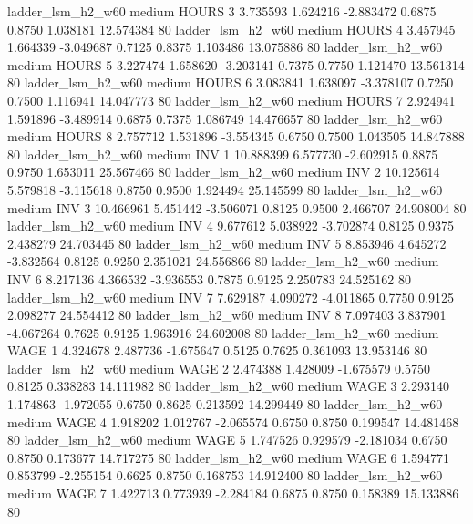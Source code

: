      ladder_lsm_h2_w60     medium    HOURS                 3  3.735593 1.624216 -2.883472 0.6875 0.8750  1.038181   12.574384 80
     ladder_lsm_h2_w60     medium    HOURS                 4  3.457945 1.664339 -3.049687 0.7125 0.8375  1.103486   13.075886 80
     ladder_lsm_h2_w60     medium    HOURS                 5  3.227474 1.658620 -3.203141 0.7375 0.7750  1.121470   13.561314 80
     ladder_lsm_h2_w60     medium    HOURS                 6  3.083841 1.638097 -3.378107 0.7250 0.7500  1.116941   14.047773 80
     ladder_lsm_h2_w60     medium    HOURS                 7  2.924941 1.591896 -3.489914 0.6875 0.7375  1.086749   14.476657 80
     ladder_lsm_h2_w60     medium    HOURS                 8  2.757712 1.531896 -3.554345 0.6750 0.7500  1.043505   14.847888 80
     ladder_lsm_h2_w60     medium      INV                 1 10.888399 6.577730 -2.602915 0.8875 0.9750  1.653011   25.567466 80
     ladder_lsm_h2_w60     medium      INV                 2 10.125614 5.579818 -3.115618 0.8750 0.9500  1.924494   25.145599 80
     ladder_lsm_h2_w60     medium      INV                 3 10.466961 5.451442 -3.506071 0.8125 0.9500  2.466707   24.908004 80
     ladder_lsm_h2_w60     medium      INV                 4  9.677612 5.038922 -3.702874 0.8125 0.9375  2.438279   24.703445 80
     ladder_lsm_h2_w60     medium      INV                 5  8.853946 4.645272 -3.832564 0.8125 0.9250  2.351021   24.556866 80
     ladder_lsm_h2_w60     medium      INV                 6  8.217136 4.366532 -3.936553 0.7875 0.9125  2.250783   24.525162 80
     ladder_lsm_h2_w60     medium      INV                 7  7.629187 4.090272 -4.011865 0.7750 0.9125  2.098277   24.554412 80
     ladder_lsm_h2_w60     medium      INV                 8  7.097403 3.837901 -4.067264 0.7625 0.9125  1.963916   24.602008 80
     ladder_lsm_h2_w60     medium     WAGE                 1  4.324678 2.487736 -1.675647 0.5125 0.7625  0.361093   13.953146 80
     ladder_lsm_h2_w60     medium     WAGE                 2  2.474388 1.428009 -1.675579 0.5750 0.8125  0.338283   14.111982 80
     ladder_lsm_h2_w60     medium     WAGE                 3  2.293140 1.174863 -1.972055 0.6750 0.8625  0.213592   14.299449 80
     ladder_lsm_h2_w60     medium     WAGE                 4  1.918202 1.012767 -2.065574 0.6750 0.8750  0.199547   14.481468 80
     ladder_lsm_h2_w60     medium     WAGE                 5  1.747526 0.929579 -2.181034 0.6750 0.8750  0.173677   14.717275 80
     ladder_lsm_h2_w60     medium     WAGE                 6  1.594771 0.853799 -2.255154 0.6625 0.8750  0.168753   14.912400 80
     ladder_lsm_h2_w60     medium     WAGE                 7  1.422713 0.773939 -2.284184 0.6875 0.8750  0.158389   15.133886 80
